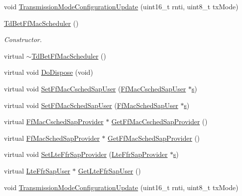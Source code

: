 \begin{DoxyCompactItemize}
\item 
void \hyperlink{classns3_1_1TdBetFfMacScheduler_a981e22a0b062b0d0872d1f043072eaeb}{Transmission\+Mode\+Configuration\+Update} (uint16\+\_\+t rnti, uint8\+\_\+t tx\+Mode)
\item 
\hyperlink{classns3_1_1TdBetFfMacScheduler_a9a3f1388b933f153fecdc65c10f7924e}{Td\+Bet\+Ff\+Mac\+Scheduler} ()
\begin{DoxyCompactList}\small\item\em Constructor. \end{DoxyCompactList}\item 
virtual \hyperlink{classns3_1_1TdBetFfMacScheduler_ac03f77c8811860d09980ead7cfad1ff7}{$\sim$\+Td\+Bet\+Ff\+Mac\+Scheduler} ()
\item 
virtual void \hyperlink{classns3_1_1TdBetFfMacScheduler_af5e206553a5bf7842fe7ac438a32a34f}{Do\+Dispose} (void)
\item 
virtual void \hyperlink{classns3_1_1TdBetFfMacScheduler_a8f41511873e2ec24d7937c15f2c2ed4c}{Set\+Ff\+Mac\+Csched\+Sap\+User} (\hyperlink{classns3_1_1FfMacCschedSapUser}{Ff\+Mac\+Csched\+Sap\+User} $\ast$\hyperlink{generate__test__data__lte__sinr_8m_ad83eeb3a142285d1243a08c6b7026df8}{s})
\item 
virtual void \hyperlink{classns3_1_1TdBetFfMacScheduler_afa96b2353838607bc9c8272133f5b367}{Set\+Ff\+Mac\+Sched\+Sap\+User} (\hyperlink{classns3_1_1FfMacSchedSapUser}{Ff\+Mac\+Sched\+Sap\+User} $\ast$\hyperlink{generate__test__data__lte__sinr_8m_ad83eeb3a142285d1243a08c6b7026df8}{s})
\item 
virtual \hyperlink{classns3_1_1FfMacCschedSapProvider}{Ff\+Mac\+Csched\+Sap\+Provider} $\ast$ \hyperlink{classns3_1_1TdBetFfMacScheduler_aef02ab26879a07f6b8f19e158077d349}{Get\+Ff\+Mac\+Csched\+Sap\+Provider} ()
\item 
virtual \hyperlink{classns3_1_1FfMacSchedSapProvider}{Ff\+Mac\+Sched\+Sap\+Provider} $\ast$ \hyperlink{classns3_1_1TdBetFfMacScheduler_a49c26c4e22af0a05ac3b8dfa8084a895}{Get\+Ff\+Mac\+Sched\+Sap\+Provider} ()
\item 
virtual void \hyperlink{classns3_1_1TdBetFfMacScheduler_a3ee1609f48ba86d97d2d159dc0ebd7be}{Set\+Lte\+Ffr\+Sap\+Provider} (\hyperlink{classns3_1_1LteFfrSapProvider}{Lte\+Ffr\+Sap\+Provider} $\ast$\hyperlink{generate__test__data__lte__sinr_8m_ad83eeb3a142285d1243a08c6b7026df8}{s})
\item 
virtual \hyperlink{classns3_1_1LteFfrSapUser}{Lte\+Ffr\+Sap\+User} $\ast$ \hyperlink{classns3_1_1TdBetFfMacScheduler_aa864ced92cb41b0aaad63ca7c53f0482}{Get\+Lte\+Ffr\+Sap\+User} ()
\item 
void \hyperlink{classns3_1_1TdBetFfMacScheduler_a981e22a0b062b0d0872d1f043072eaeb}{Transmission\+Mode\+Configuration\+Update} (uint16\+\_\+t rnti, uint8\+\_\+t tx\+Mode)
\end{DoxyCompactItemize}
